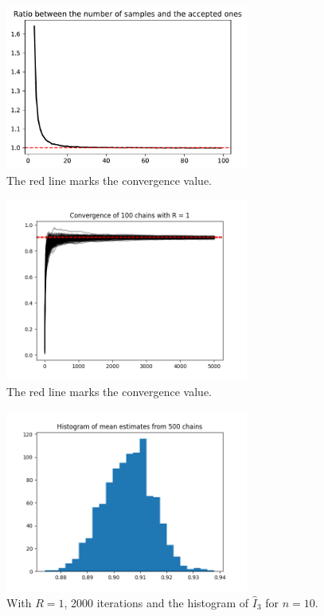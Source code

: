 \documentclass[a4paper,10pt, notitlepage]{report}
\begin{document}
\begin{figure}[htb]
    \centering
    \includegraphics[width=8cm]{images/ratio_number_samples.pdf}
    \caption{\label{fig:ratio_number_samples}The red line marks the
    convergence value.}
\end{figure}

\begin{figure}[htb]
    \centering
    \includegraphics[width=8cm]{images/convergence_chains.png}
    \caption{\label{fig:convergence_chains}The red line marks the
    convergence value.}
\end{figure}

\begin{figure}[htb]
    \centering
    \includegraphics[width=8cm]{images/histogram_mean_estimates.png}
    \caption{\label{fig:histogram_mean_estimates}With $R = 1$, 2000
    iterations and the histogram of $\hat{I}_3$ for $n=10$.}
\end{figure}



\end{document}
